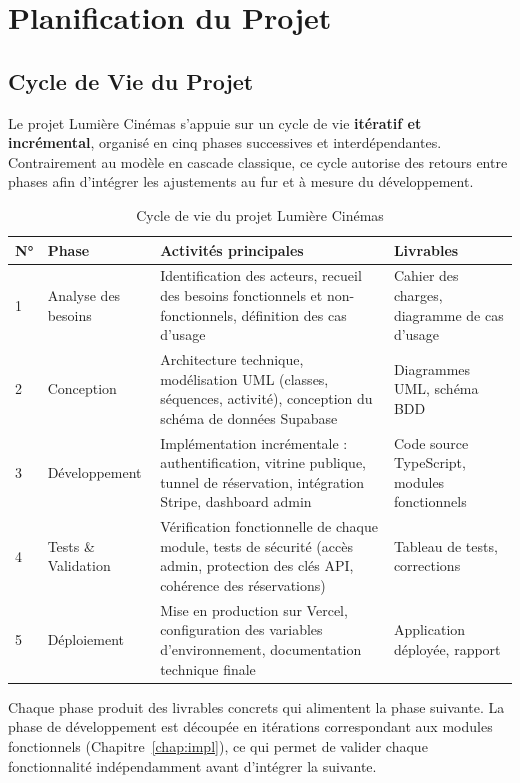 \documentclass[12pt,a4paper,openany]{report}
\begin{document}
\chapter{Planification du Projet}

\section{Cycle de Vie du Projet}

Le projet Lumière Cinémas s'appuie sur un cycle de vie \textbf{itératif et incrémental}, organisé en cinq phases successives et interdépendantes. Contrairement au modèle en cascade classique, ce cycle autorise des retours entre phases afin d'intégrer les ajustements au fur et à mesure du développement.

\begin{table}[H]
\centering
\begin{tabular}{p{0.5cm}p{2.8cm}p{5.5cm}p{3.5cm}}
\toprule
\textbf{N°} & \textbf{Phase} & \textbf{Activités principales} & \textbf{Livrables} \\
\midrule
1 & Analyse des besoins & Identification des acteurs, recueil des besoins fonctionnels et non-fonctionnels, définition des cas d'usage & Cahier des charges, diagramme de cas d'usage \\
\midrule
2 & Conception & Architecture technique, modélisation UML (classes, séquences, activité), conception du schéma de données Supabase & Diagrammes UML, schéma BDD \\
\midrule
3 & Développement & Implémentation incrémentale : authentification, vitrine publique, tunnel de réservation, intégration Stripe, dashboard admin & Code source TypeScript, modules fonctionnels \\
\midrule
4 & Tests \& Validation & Vérification fonctionnelle de chaque module, tests de sécurité (accès admin, protection des clés API, cohérence des réservations) & Tableau de tests, corrections \\
\midrule
5 & Déploiement & Mise en production sur Vercel, configuration des variables d'environnement, documentation technique finale & Application déployée, rapport \\
\bottomrule
\end{tabular}
\caption{Cycle de vie du projet Lumière Cinémas}
\label{tab:cycle_vie}
\end{table}

Chaque phase produit des livrables concrets qui alimentent la phase suivante. La phase de développement est découpée en itérations correspondant aux modules fonctionnels (Chapitre~\ref{chap:impl}), ce qui permet de valider chaque fonctionnalité indépendamment avant d'intégrer la suivante.
\end{document}
